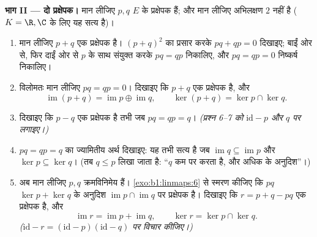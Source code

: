 \begin{problem}
\medskip \noindent\textbf{भाग II --- दो प्रक्षेपक।} मान लीजिए $p, q$ $E$ के
प्रक्षेपक हैं; और मान लीजिए अभिलक्षण $2$ नहीं है ($K = \R, \C$ के लिए यह
सत्य है)।
\begin{enumerate}[resume]
  \item मान लीजिए $p + q$ एक प्रक्षेपक है। $(p + q)^2$ का प्रसार करके $pq +
  qp = 0$ दिखाइए; बाईं ओर से, फिर दाईं ओर से $p$ के साथ संयुक्त करके $pq =
  qp$ निकालिए, और $pq = qp = 0$ निष्कर्ष निकालिए।
  \item विलोमतः मान लीजिए $pq = qp = 0$। दिखाइए कि $p + q$ एक प्रक्षेपक है,
  और
        \[
        \operatorname{im}(p + q) = \operatorname{im} p \oplus
        \operatorname{im} q,
        \qquad
        \ker(p + q) = \ker p \cap \ker q .
        \]
  \item दिखाइए कि $p - q$ एक प्रक्षेपक है तभी जब $pq = qp = q$।
  \emph{(प्रश्न 6--7 को $\mathrm{id} - p$ और $q$ पर लगाइए।)}
  \item $pq = qp = q$ का ज्यामितीय अर्थ दिखाइए: यह तभी सत्य है जब
  $\operatorname{im} q \subseteq \operatorname{im} p$ और $\ker p \subseteq
  \ker q$। (तब $q \leq p$ लिखा जाता है: ``$q$ कम पर  करता है, और
  अधिक के अनुदिश''।)
  \item अब मान लीजिए $p, q$ क्रमविनिमेय हैं। \cref{exo:b1:linmaps:6} से
  स्मरण कीजिए कि $pq$ $\ker p + \ker q$ के अनुदिश $\operatorname{im} p \cap
  \operatorname{im} q$ पर प्रक्षेपक है। दिखाइए कि $r = p + q - pq$ एक
  प्रक्षेपक है, और
        \[
        \operatorname{im} r = \operatorname{im} p +
        \operatorname{im} q,
        \qquad
        \ker r = \ker p \cap \ker q .
        \]
        \emph{($\mathrm{id} - r = (\mathrm{id} - p)(\mathrm{id} - q)$ पर
        विचार कीजिए।)}
\end{enumerate}


\end{problem}
